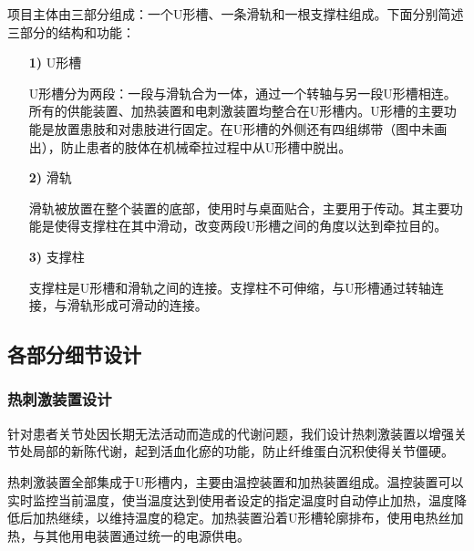 \documentclass[UTF8]{ctexart}
\begin{document}
        项目主体由三部分组成：一个U形槽、一条滑轨和一根支撑柱组成。下面分别简述三部分的结构和功能：
        \begin{enumerate}
            \item[\textbf{1)}]U形槽

                U形槽分为两段：一段与滑轨合为一体，通过一个转轴与另一段U形槽相连。所有的供能装置、加热装置和电刺激装置均整合在U形槽内。U形槽的主要功能是放置患肢和对患肢进行固定。在U形槽的外侧还有四组绑带（图中未画出），防止患者的肢体在机械牵拉过程中从U形槽中脱出。

            \item[\textbf{2)}]滑轨

                滑轨被放置在整个装置的底部，使用时与桌面贴合，主要用于传动。其主要功能是使得支撑柱在其中滑动，改变两段U形槽之间的角度以达到牵拉目的。
            \item[\textbf{3)}]支撑柱  

                支撑柱是U形槽和滑轨之间的连接。支撑柱不可伸缩，与U形槽通过转轴连接，与滑轨形成可滑动的连接。
        \end{enumerate}
        
    \subsection{各部分细节设计}
        \subsubsection{热刺激装置设计}
            针对患者关节处因长期无法活动而造成的代谢问题，我们设计热刺激装置以增强关节处局部的新陈代谢，起到活血化瘀的功能，防止纤维蛋白沉积使得关节僵硬。

            热刺激装置全部集成于U形槽内，主要由温控装置和加热装置组成。温控装置可以实时监控当前温度，使当温度达到使用者设定的指定温度时自动停止加热，温度降低后加热继续，以维持温度的稳定。加热装置沿着U形槽轮廓排布，使用电热丝加热，与其他用电装置通过统一的电源供电。
\end{document}
